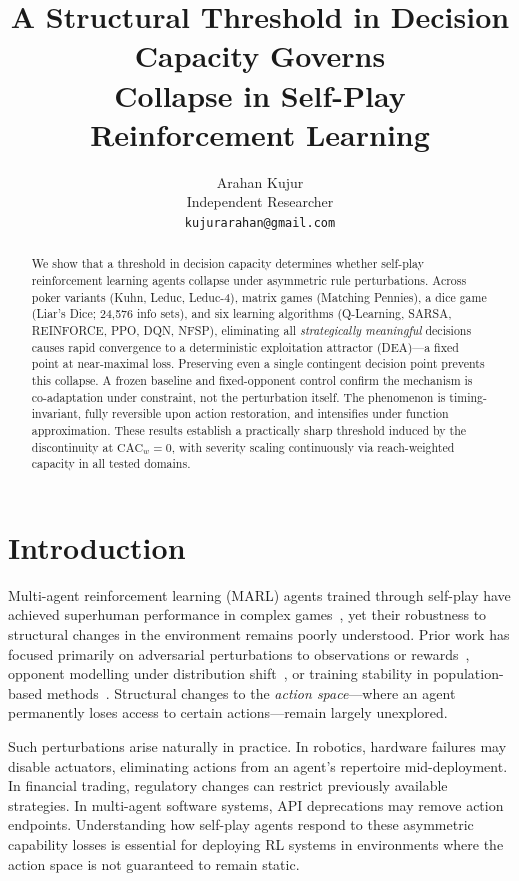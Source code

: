 \documentclass{article}
\title{A Structural Threshold in Decision Capacity Governs\\Collapse in Self-Play Reinforcement Learning}
\author{
  Arahan Kujur\\
  Independent Researcher\\
  \texttt{kujurarahan@gmail.com}
}
\begin{document}
\maketitle

\begin{abstract}
We show that a threshold in decision capacity determines whether self-play reinforcement learning agents collapse under asymmetric rule perturbations. Across poker variants (Kuhn, Leduc, Leduc-4), matrix games (Matching Pennies), a dice game (Liar's Dice; 24{,}576 info sets), and six learning algorithms (Q-Learning, SARSA, REINFORCE, PPO, DQN, NFSP), eliminating all \emph{strategically meaningful} decisions causes rapid convergence to a deterministic exploitation attractor (DEA)---a fixed point at near-maximal loss. Preserving even a single contingent decision point prevents this collapse. A frozen baseline and fixed-opponent control confirm the mechanism is co-adaptation under constraint, not the perturbation itself. The phenomenon is timing-invariant, fully reversible upon action restoration, and intensifies under function approximation. These results establish a practically sharp threshold induced by the discontinuity at $\text{CAC}_w = 0$, with severity scaling continuously via reach-weighted capacity in all tested domains.
\end{abstract}

\section{Introduction}

Multi-agent reinforcement learning (MARL) agents trained through self-play have achieved superhuman performance in complex games~\citep{silver2018general,brown2019superhuman,vinyals2019grandmaster}, yet their robustness to structural changes in the environment remains poorly understood. Prior work has focused primarily on adversarial perturbations to observations or rewards~\citep{gleave2020adversarial}, opponent modelling under distribution shift~\citep{foerster2018learning}, or training stability in population-based methods~\citep{balduzzi2019open}. Structural changes to the \emph{action space}---where an agent permanently loses access to certain actions---remain largely unexplored.

Such perturbations arise naturally in practice. In robotics, hardware failures may disable actuators, eliminating actions from an agent's repertoire mid-deployment. In financial trading, regulatory changes can restrict previously available strategies. In multi-agent software systems, API deprecations may remove action endpoints. Understanding how self-play agents respond to these asymmetric capability losses is essential for deploying RL systems in environments where the action space is not guaranteed to remain static.
\end{document}
